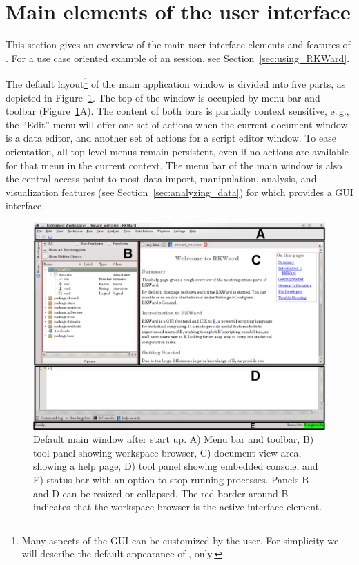 \section{Main elements of the user interface}
\label{sec:user_interface}
This section gives an overview of the main user interface elements and features of .
For a use case oriented example of an  session, see Section~\ref{sec:using_RKWard}.

The default layout\footnote{
 Many aspects of the  GUI can be customized by the user. For simplicity we will
 describe the default appearance of , only.
} of the main application window is divided into five
parts, as depicted in Figure~\ref{fig:main_window}. The top of the window is occupied by menu bar and toolbar 
(Figure~\ref{fig:main_window}A). The content of both bars is partially context
sensitive, e.\,g., the ``Edit'' menu will offer
one set of actions when the current document window is a data editor,
and another set of actions for a  script
editor window. To ease orientation, all top level menus remain
persistent, even if no actions are available for that menu in the
current context. The menu bar of the main window is also the central
access point to most data import, manipulation, analysis, and
visualization features (see Section~\ref{sec:analyzing_data}) for which  provides a GUI
interface.

\begin{figure}[h!]
 \centering
 \includegraphics[width=15.450cm]{./figures/main_window.png}
 \caption{Default  main window after start up. 
A) Menu bar and toolbar, B) tool panel showing workspace browser, C) document view area, showing
a help page, D) tool panel showing embedded  console, and E) status bar with an option to stop running processes.
Panels B and D can be resized or collapsed. The red border around B indicates that the workspace browser is the active interface element.}
 \label{fig:main_window}
\end{figure}

